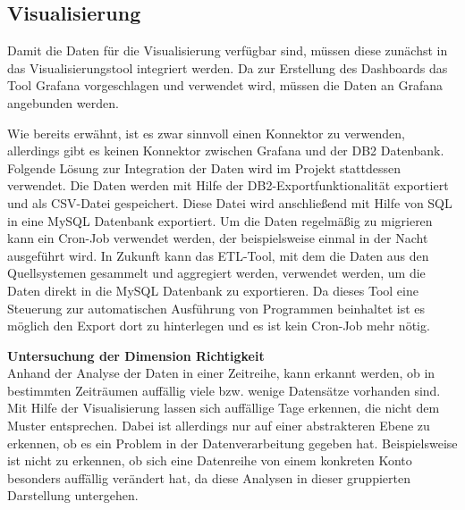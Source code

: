 


\subsection{Visualisierung}
\label{sub:visualisierung}
Damit die Daten für die Visualisierung verfügbar sind, müssen diese zunächst in das Visualisierungstool integriert werden. 
Da zur Erstellung des Dashboards das Tool Grafana vorgeschlagen und verwendet wird, müssen die Daten an Grafana angebunden werden.

Wie bereits erwähnt, ist es zwar sinnvoll einen Konnektor zu verwenden, allerdings gibt es keinen Konnektor zwischen Grafana und der DB2 Datenbank.  \\

Folgende Lösung zur Integration der Daten wird im Projekt stattdessen verwendet. 
Die Daten werden mit Hilfe der DB2-Exportfunktionalität exportiert und als CSV-Datei gespeichert. 
Diese Datei wird anschließend mit Hilfe von SQL in eine MySQL Datenbank exportiert. 
Um die Daten regelmäßig zu migrieren kann ein Cron-Job verwendet werden, der beispielsweise einmal in der Nacht ausgeführt wird. 
In Zukunft kann das ETL-Tool, mit dem die Daten aus den Quellsystemen gesammelt und aggregiert werden, verwendet werden, um die Daten direkt in die MySQL Datenbank zu exportieren.
Da dieses Tool eine Steuerung zur automatischen Ausführung von Programmen beinhaltet ist es möglich den Export dort zu hinterlegen und es ist kein Cron-Job mehr nötig. 




\textbf{Untersuchung der Dimension Richtigkeit} \\
Anhand der Analyse der Daten in einer Zeitreihe, kann erkannt werden, ob in bestimmten Zeiträumen auffällig viele bzw. wenige Datensätze vorhanden sind. 
Mit Hilfe der Visualisierung lassen sich auffällige Tage erkennen, die nicht dem Muster entsprechen. 
Dabei ist allerdings nur auf einer abstrakteren Ebene zu erkennen, ob es ein Problem in der Datenverarbeitung gegeben hat. 
Beispielsweise ist nicht zu erkennen, ob sich eine Datenreihe von einem konkreten Konto besonders auffällig verändert hat, da diese Analysen in dieser gruppierten Darstellung untergehen. 

